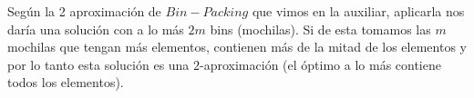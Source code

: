 \documentclass[dcc,uchile]{fcfmcourse}
\theoremstyle{plain}
\theoremstyle{definition}
\begin{document}
\begin{problems}
\problem Según la 2 aproximación de $Bin-Packing$ que vimos en la auxiliar, aplicarla nos daría una solución con a lo más $2m$ bins (mochilas). Si de esta tomamos las $m$ mochilas que tengan más elementos, contienen más de la mitad de los elementos y por lo tanto esta solución es una $2$-aproximación (el óptimo a lo más contiene todos los elementos).
\end{problems}
\end{document}
